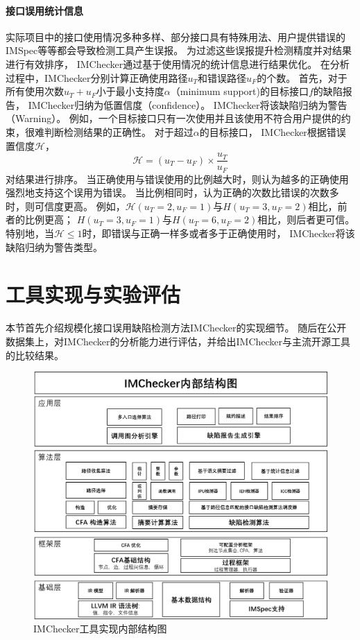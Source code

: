 \paragraph{接口误用统计信息}
实际项目中的接口使用情况多种多样、部分接口具有特殊用法、用户提供错误的IMSpec等等都会导致检测工具产生误报。
为过滤这些误报提升检测精度并对结果进行有效排序，
IMChecker通过基于使用情况的统计信息进行结果优化。
在分析过程中，IMChecker分别计算正确使用路径$u_T$和错误路径$u_F$的个数。
首先，对于所有使用次数$u_T+u_F$小于最小支持度$\alpha$（minimum support)的目标接口$f$的缺陷报告，
IMChecker归纳为低置信度（confidence）。
IMChecker将该缺陷归纳为警告（Warning）。
例如，一个目标接口只有一次使用并且该使用不符合用户提供的约束，很难判断检测结果的正确性。
对于超过$\alpha$的目标接口，
IMChecker根据错误置信度$\mathcal{H}$，
\begin{equation}
\label{eq:3-1}
\mathcal{H}  = ({u_T-u_F})\times\dfrac{u_T}{u_F}
\end{equation}
对结果进行排序。
当正确使用与错误使用的比例越大时，则认为越多的正确使用强烈地支持这个误用为错误。
当比例相同时，认为正确的次数比错误的次数多时，则可信度更高。
例如，$\mathcal{H}(u_T=2, u_F=1)$与$H(u_T=3, u_F=2)$相比，前者的比例更高；
$H(u_T=3, u_F=1)$与$H(u_T=6, u_F=2)$相比，则后者更可信。
特别地，当$\mathcal{H} \le 1$时，即错误与正确一样多或者多于正确使用时，
IMChecker将该缺陷归纳为警告类型。

\section{工具实现与实验评估}
\label{sec:3.4}
本节首先介绍规模化接口误用缺陷检测方法IMChecker的实现细节。
随后在公开数据集上，对IMChecker的分析能力进行评估，并给出IMChecker与主流开源工具的比较结果。

\begin{figure}[t]
	\centering
	\includegraphics[width=0.9\linewidth]{figures/cp3-implementation.png}
	\caption{
		IMChecker工具实现内部结构图
	}
	\label{fig:3-4-implementation}
\end{figure}

